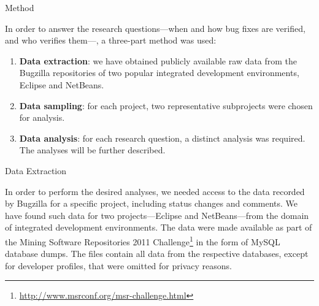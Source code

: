 \begin{section}{Method} \label{sec:methods}


	In order to answer the research questions---when and how bug fixes are verified, and who verifies them---, a three-part method was used:
	
	\begin{enumerate}
		\item \textbf{Data extraction}: we have obtained publicly available raw data from the Bugzilla repositories of two popular integrated development environments, Eclipse and NetBeans.

		\item \textbf{Data sampling}: for each project, two representative subprojects were chosen for analysis.
		
		
		
		\item \textbf{Data analysis}: for each research question, a distinct analysis was required. The analyses will be further described.
	\end{enumerate}	

\begin{subsection}{Data Extraction}
	
	In order to perform the desired analyses, we needed access to the data recorded by Bugzilla for a specific project, including status changes and comments. We have found such data for two projects---Eclipse and NetBeans---from the domain of integrated development environments. The data were made available as part of the Mining Software Repositories 2011 Challenge\footnote{\url{http://www.msrconf.org/msr-challenge.html}} in the form of MySQL database dumps. The files contain all data from the respective databases, except for developer profiles, that were omitted for privacy reasons.
	


\end{subsection}
\end{section}

